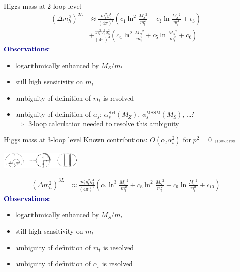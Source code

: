 \documentclass[hyperref={pdfpagelabels=false},ngerman]{beamer}
\newcommand{\cmark}{\ding{51}}%
\newcommand{\ok}{\textcolor{darkgreen}{\cmark}}
\newcommand{\MS}{\ensuremath{M_S}}
\newcommand{\mycite}[1]{\ensuremath{\text{\textcolor{darkgray}{\tiny [#1]}}}}
\renewcommand{\emph}[1]{\textbf{\textcolor{darkblue}{#1}}}
\newcommand{\SM}{\ensuremath{\text{SM}}}
\newcommand{\MSSM}{\ensuremath{\text{MSSM}}}
\newcommand{\at}{\alpha_t}
\newcommand{\as}{\alpha_s}
\begin{document}
\begin{frame}{Higgs mass at 2-loop level}
  \begin{align*}
    (\Delta m_h^2)^{2L} &\approx
    \frac{m_t^2 y_t^4}{(4\pi)^4} \left(
      c_1 \ln^2\frac{\MS^2}{m_t^2}
      + c_2 \ln\frac{\MS^2}{m_t^2}
      + c_3
    \right) \\
    & +
    \frac{m_t^2 y_t^2 g_3^2}{(4\pi)^4} \left(
      c_4 \ln^2\frac{\MS^2}{m_t^2}
      + c_5 \ln\frac{\MS^2}{m_t^2}
      + c_6
    \right)
  \end{align*}
  \emph{Observations:}
  \begin{itemize}
  \item logarithmically enhanced by $\MS / m_t$
  \item still high sensitivity on $m_t$
  \item ambiguity of definition of $m_t$ is resolved \ok
  \item ambiguity of definition of $\as$: $\as^\SM(M_Z)$, $\as^\MSSM(\MS)$, \ldots ? \\
    $\Rightarrow$ 3-loop calculation needed to resolve this ambiguity
  \end{itemize}
\end{frame}

\begin{frame}{Higgs mass at 3-loop level}
  Known contributions: $O(\at\as^2)$ for $p^2 = 0$ \mycite{1005.5709}
  \begin{center}
    \includegraphics[width=0.3\textwidth]{images/h3l-atasas}
  \end{center}
  \begin{align*}
    (\Delta m_h^2)^{3L} &\approx
    \frac{m_t^2 y_t^2 g_3^4}{(4\pi)^6} \left(
      c_7 \ln^3\frac{\MS^2}{m_t^2}
      + c_8 \ln^2\frac{\MS^2}{m_t^2}
      + c_9 \ln\frac{\MS^2}{m_t^2}
      + c_{10}
    \right)
  \end{align*}
  \emph{Observations:}
  \begin{itemize}
  \item logarithmically enhanced by $\MS / m_t$
  \item still high sensitivity on $m_t$
  \item ambiguity of definition of $m_t$ is resolved \ok
  \item ambiguity of definition of $\as$ is resolved \ok
  \end{itemize}
\end{frame}
\end{document}
